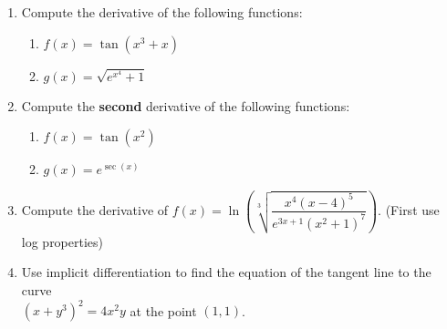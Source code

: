 \documentclass[12pt]{article}
\newcommand{\di}{\displaystyle}
\begin{document}
\newpage


  \begin{enumerate}
    \item Compute the derivative of the following functions:
    \begin{enumerate}
    \item $f(x) = \tan(x^3+x)$
    
    \vspace{1.5in}
    
    \item $\di g(x) = \sqrt{e^{x^4}+1}$
    \end{enumerate}

    \vspace{1.5in}

    \item Compute the \textbf{second} derivative of the following functions:
    \begin{enumerate}
    \item $f(x) = \tan(x^2)$
    
    \vspace{2in}
    
    \item $\di g(x) = e^{\sec(x)}$
    \end{enumerate}
\newpage
  
   \item Compute the derivative of $f(x) = \ln\left(\sqrt[3]{\dfrac{x^4(x-4)^5}{e^{3x+1}(x^2+1)^7}}\right)$. (First use log properties)
  
   \vspace{3.75in}
   

       
    \item Use implicit differentiation to find the equation of the tangent line to the curve\\ $(x+y^3)^2=4x^2y$ at the point $(1,1)$.   
  \end{enumerate}
\end{document}
